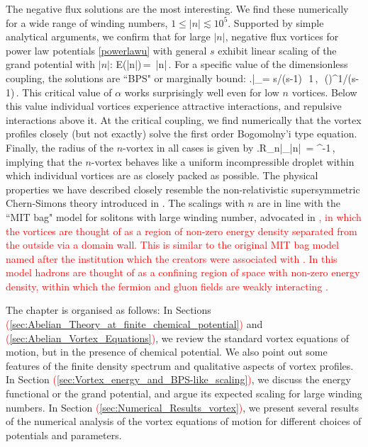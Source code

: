 The negative flux solutions are the most interesting. We find these numerically for a wide range of winding numbers, $1\leq |n| \lesssim 10^5$. Supported by simple analytical arguments, we confirm that for large $|n|$, negative flux vortices for power law potentials \eqref{powerlawu} with general $s$  exhibit linear scaling of the grand potential with $|n|$:
\be
{\cal E}(|n|)\,=\, |n|\,.
\ee
For a specific value of the dimensionless coupling, the solutions are ``BPS" or marginally bound:
\be
\left.\right|_{\alpha = s/(s-1)}\,\to\, 1\,,\qquad \alpha\,\equiv\,
\left(\right)^{1/(s-1)}\,.
\ee
This critical value of $\alpha$ works surprisingly well even for low $n$ vortices. Below this value  individual vortices experience attractive interactions,  and repulsive interactions above it.  At the critical coupling, we find numerically that the vortex profiles closely (but not exactly) solve the first order Bogomolny'i type equation.
Finally, the radius of the $n$-vortex in all cases is given by
\be
\left.R_n\right|_{|n|} \,=\,\,\mu^{-1}\,,
\ee
implying  that the $n$-vortex behaves like a uniform incompressible droplet within which individual vortices are as closely packed as possible. The physical properties we have described  closely resemble the non-relativistic supersymmetric Chern-Simons theory introduced in \cite{Tong:2015xaa}. The scalings with $n$ are in line with the ``MIT bag" model for solitons with large winding number, advocated in \cite{Bolognesi:2005ty, Bolognesi:2005rk, Bolognesi:2007ez}\textcolor{red}{, in which  the vortices are thought of as a region of non-zero energy density separated from the outside via a domain wall. This is similar to the original MIT bag model named after the institution which the creators were associated with \cite{PhysRevD.9.3471}. In this model hadrons are thought of as a confining region of space with non-zero energy density, within which the fermion and gluon fields are weakly interacting .} 

The chapter is organised as follows: In Sections \textcolor{red}{(}\ref{sec:Abelian_Theory_at_finite_chemical_potential}\textcolor{red}{)} and \textcolor{red}{(}\ref{sec:Abelian_Vortex_Equations}\textcolor{red}{)}, we review the  standard vortex equations of motion, but in the presence of chemical potential. We also point out some features of the finite density spectrum and qualitative aspects of vortex profiles.  In Section \textcolor{red}{(}\ref{sec:Vortex_energy_and_BPS-like_scaling}\textcolor{red}{)}, we discuss the energy functional or the grand potential, and argue its expected scaling for large winding numbers. In Section \textcolor{red}{(}\ref{sec:Numerical_Results_vortex}\textcolor{red}{)}, we present several results of the numerical analysis of the vortex equations of motion for different choices of potentials and parameters.
